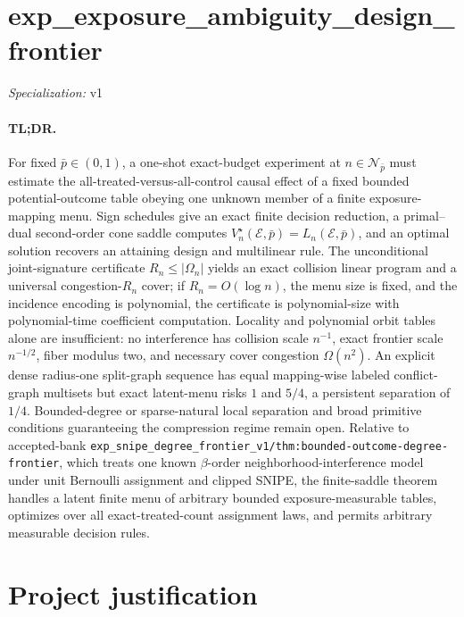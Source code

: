\documentclass{article}
\begin{document}
\sloppy

\section*{exp\_\allowbreak{}exposure\_\allowbreak{}ambiguity\_\allowbreak{}design\_\allowbreak{}frontier}

\noindent\textit{Specialization:} v1\par

\paragraph{TL;DR.} For fixed \(\bar p\in(0,1)\), a one-shot exact-budget experiment at \(n\in\mathcal N_{\bar p}\) must estimate the all-treated-versus-all-control causal effect of a fixed bounded potential-outcome table obeying one unknown member of a finite exposure-mapping menu. Sign schedules give an exact finite decision reduction, a primal--dual second-order cone saddle computes \(V_n^\star(\mathcal E,\bar p)=L_n(\mathcal E,\bar p)\), and an optimal solution recovers an attaining design and multilinear rule. The unconditional joint-signature certificate \(R_n\le|\Omega_n|\) yields an exact collision linear program and a universal congestion-\(R_n\) cover; if \(R_n=O(\log n)\), the menu size is fixed, and the incidence encoding is polynomial, the certificate is polynomial-size with polynomial-time coefficient computation. Locality and polynomial orbit tables alone are insufficient: no interference has collision scale \(n^{-1}\), exact frontier scale \(n^{-1/2}\), fiber modulus two, and necessary cover congestion \(\Omega(n^2)\). An explicit dense radius-one split-graph sequence has equal mapping-wise labeled conflict-graph multisets but exact latent-menu risks \(1\) and \(5/4\), a persistent separation of \(1/4\). Bounded-degree or sparse-natural local separation and broad primitive conditions guaranteeing the compression regime remain open. Relative to accepted-bank \texttt{exp\_snipe\_degree\_frontier\_v1/thm:bounded-outcome-degree-frontier}, which treats one known \(\beta\)-order neighborhood-interference model under unit Bernoulli assignment and clipped SNIPE, the finite-saddle theorem handles a latent finite menu of arbitrary bounded exposure-measurable tables, optimizes over all exact-treated-count assignment laws, and permits arbitrary measurable decision rules.

\section{Project justification}
\end{document}

